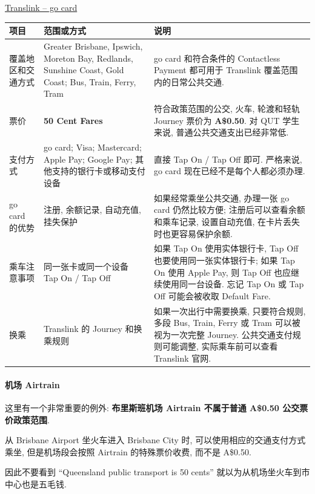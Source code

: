 \documentclass[UTF8,a4paper,12pt]{ctexart}
\newcommand{\official}[2]{\href{#1}{#2}}
\begin{document}
\official{https://translink.com.au/tickets-and-fares/go-card}{Translink -- go card}

\scriptsize
\renewcommand{\arraystretch}{1.15}
\begin{longtable}{@{}>{\raggedright\arraybackslash}p{}>{\raggedright\arraybackslash}p{}>{\raggedright\arraybackslash}p{}@{}}
\toprule
项目 & 范围或方式 & 说明 \\
\midrule
\endhead
覆盖地区和交通方式 &
Greater Brisbane, Ipswich, Moreton Bay, Redlands, Sunshine Coast, Gold Coast; Bus, Train, Ferry, Tram &
go card 和符合条件的 Contactless Payment 都可用于 Translink 覆盖范围内的日常公共交通. \\
票价 &
\textbf{50 Cent Fares} &
符合政策范围的公交, 火车, 轮渡和轻轨 Journey 票价为 \textbf{A\$0.50}. 对 QUT 学生来说, 普通公共交通支出已经非常低. \\
支付方式 &
go card; Visa; Mastercard; Apple Pay; Google Pay; 其他支持的银行卡或移动支付设备 &
直接 Tap On / Tap Off 即可. 严格来说, go card 现在已经不是每个人都必须办理. \\
go card 的优势 &
注册, 余额记录, 自动充值, 挂失保护 &
如果经常乘坐公共交通, 办理一张 go card 仍然比较方便; 注册后可以查看余额和乘车记录, 设置自动充值, 在卡片丢失时也更容易保护余额. \\
乘车注意事项 &
同一张卡或同一个设备 Tap On / Tap Off &
如果 Tap On 使用实体银行卡, Tap Off 也要使用同一张实体银行卡; 如果 Tap On 使用 Apple Pay, 则 Tap Off 也应继续使用同一台设备. 忘记 Tap On 或 Tap Off 可能会被收取 Default Fare. \\
换乘 &
Translink 的 Journey 和换乘规则 &
如果一次出行中需要换乘, 只要符合规则, 多段 Bus, Train, Ferry 或 Tram 可以被视为一次完整 Journey. 公共交通支付规则可能调整, 实际乘车前可以查看 Translink 官网. \\
\bottomrule
\end{longtable}
\normalsize

\paragraph{机场 Airtrain}

这里有一个非常重要的例外: \textbf{布里斯班机场 Airtrain 不属于普通 A\$0.50 公交票价政策范围}. 

从 Brisbane Airport 坐火车进入 Brisbane City 时, 可以使用相应的交通支付方式乘坐, 但是机场段会按照 Airtrain 的特殊票价收费, 而不是 A\$0.50. 

因此不要看到 ``Queensland public transport is 50 cents'' 就以为从机场坐火车到市中心也是五毛钱. 
\end{document}
